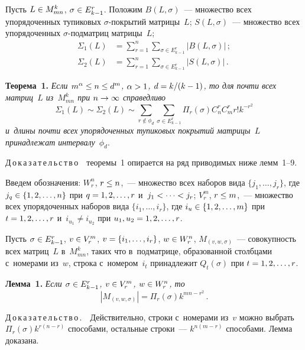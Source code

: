 \begin{multicols}{2}
    Пусть $L\hm\in M^k_{mn}$, $\sigma\hm\in E^r_{k-1}$. Положим 
$B(L,\sigma)$~--- множество всех упорядоченных тупиковых  
$\sigma$-по\-кры\-тий матрицы~$L$; $S(L,\sigma)$~--- множество всех 
упорядоченных $\sigma$-под\-мат\-риц матрицы~$L$;
    \begin{align*}
    \Sigma_1(L) &= \sum\limits^n_{r=1} \sum\limits_{\sigma\in E^r_{k-1} }\vert 
B(L,\sigma)\vert\,;\\
    \Sigma_2(L)&=\sum\limits^n_{r=1}\sum\limits_{\sigma\in E^r_{k-1}} \vert 
S(L,\sigma)\vert\,.
    \end{align*}
    
    \noindent
    \textbf{Теорема~1.} \textit{Если $m^\alpha \hm\leq n\hm\leq d^m$, 
$\alpha\hm>1$, $d\hm= k/(k\hm-1)$, то для почти всех матриц~$L$ 
из~$M^k_{mn}$ при $n\hm\to \infty$ справедливо}
    $$
    \Sigma_1(L)\sim\Sigma_2(L)\sim \sum\limits_{r\notin \phi_d} 
\sum\limits_{\sigma\in E^r_{k-1}} \Pi_r(\sigma) C_n^r C_m^r r! k^{-r^2}
    $$
\textit{и~длины почти всех упорядоченных тупиковых покрытий матрицы~$L$ 
принадлежат интервалу}~$\phi_d$.

\smallskip

    
    \noindent
    Д\,о\,к\,а\,з\,а\,т\,е\,л\,ь\,с\,т\,в\,о\ \  теоремы~1 опирается на ряд 
приводимых ниже лемм~1--9.
    
    Введем обозначения: $W_r^n$, $r\hm\leq n$,~--- множество всех наборов 
вида $\{j_1,\ldots, j_r\}$, где $j_q\hm\in \{1,2,\ldots, n\}$ при $q\hm= 1,2,\ldots, 
r$ и~$j_1\hm< \cdots <j_r$; $V_r^m$, $r\hm\leq m$,~--- множество всех 
упорядоченных наборов вида $\{i_1, \ldots, i_r\}$, где $i_u\hm\in \{1,2,\ldots, 
m\}$ при $t\hm=1,2,\ldots, r$ и~$i_{u_1}\not= i_{u_2}$ при $u_1, 
u_2\hm=1,2,\ldots, r$.
    
    Пусть $\sigma\hm\in E^r_{k-1}$, $v\hm\in V_r^m$, $v\hm=\{ i_1, \ldots, i_r\}$, 
$w\hm\in W_r^n$, $M_{(v,w,\sigma)}$~--- совокупность всех матриц~$L$ 
в~$M^k_{mn}$, таких что в~подматрице, образованной столбцами с~номерами 
из~$w$, строка с~номером~$i_t$ принадлежит $Q_t(\sigma)$ при 
$t\hm=1,2,\ldots, r$.  
    
    \smallskip
    
    \noindent
    \textbf{Лемма~1.} \textit{Если $\sigma\hm\in E^r_{k-1}$, $v\hm\in V_r^m$, 
$w\hm\in W_r^n$, то} 
    $$
    \left\vert M_{(v,w,\sigma)}\right\vert=\Pi_r(\sigma) k^{mn-r^2}\,.
    $$
    
    \noindent
    Д\,о\,к\,а\,з\,а\,т\,е\,л\,ь\,с\,т\,в\,о\,.\ \ Действительно, строки 
с~номерами из~$v$ можно выбрать $\Pi_r(\sigma) k^{r(n-r)}$ способами, 
остальные строки~--- $k^{n(m-r)}$ способами. Лемма доказана.
    

\end{multicols}
